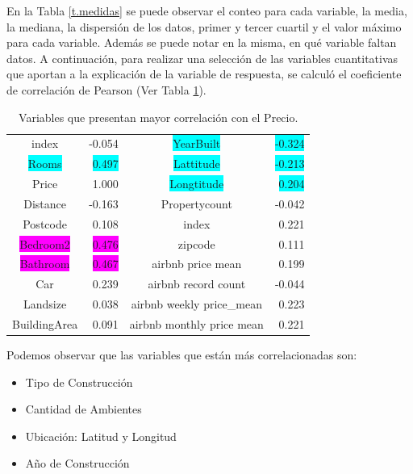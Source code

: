 En la Tabla \ref{t.medidas} se puede observar el conteo para cada variable, la media, la mediana, la dispersión de los datos, primer y tercer cuartil y el valor máximo para cada variable. Además se puede notar en la misma, en qué variable faltan datos.
A continuación, para realizar una selección de las variables cuantitativas que aportan a la explicación de la variable de respuesta, se calculó el coeficiente de correlación de Pearson (Ver Tabla \ref{t.corr}).
\begin{table} [!ht]
\small
\centering
\caption{Variables que presentan mayor correlación con el Precio.}
    \label{t.corr}
\begin{tabular}{crcr}
\hline\hline
index & -0.054 & \colorbox{cyan}{YearBuilt} & \colorbox{cyan}{-0.324} \\
\colorbox{cyan}{Rooms} & \colorbox{cyan}{0.497}  & \colorbox{cyan}{Lattitude} & \colorbox{cyan}{-0.213} \\
Price & 1.000 & \colorbox{cyan}{Longtitude} & \colorbox{cyan}{0.204} \\
Distance & -0.163 & Propertycount & -0.042 \\
Postcode & 0.108 & index & 0.221 \\
\colorbox{magenta}{Bedroom2} & \colorbox{magenta}{0.476} & zipcode & 0.111 \\
\colorbox{magenta}{Bathroom} & \colorbox{magenta}{0.467} & airbnb price mean  & 0.199 \\
Car & 0.239 & airbnb record count & -0.044 \\
Landsize & 0.038 & airbnb weekly price\_mean & 0.223 \\
BuildingArea & 0.091 & airbnb monthly price mean & 0.221 \\
\hline\hline
\end{tabular}
\end{table}
Podemos observar que las variables que están más correlacionadas son:

\begin{itemize}
\item Tipo de Construcción
\item Cantidad de Ambientes
\item Ubicación: Latitud y Longitud
\item Año de Construcción
\end{itemize}


